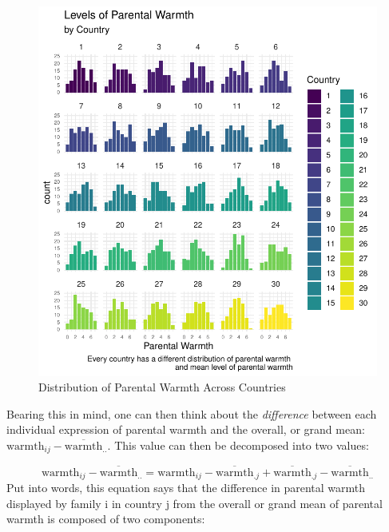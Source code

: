\documentclass[
  letterpaper,
  DIV=11,
  numbers=noendperiod]{scrreprt}
\begin{document}
\begin{figure}

{\centering \includegraphics{./cross-sectional_files/figure-pdf/fig-distributionwarmth-1.pdf}

}

\caption{\label{fig-distributionwarmth}Distribution of Parental Warmth
Across Countries}

\end{figure}

Bearing this in mind, one can then think about the \emph{difference}
between each individual expression of parental warmth and the overall,
or grand mean: \(\text{warmth}_{ij} - \overline{\text{warmth}}_{..}\).
This value can then be decomposed into two values:

\[\text{warmth}_{ij} - \overline{\text{warmth}}_{..} = \text{warmth}_{ij} - \overline{\text{warmth}}_{.j} + \overline{\text{warmth}}_{.j} - \overline{\text{warmth}}_{..}\]
Put into words, this equation says that the difference in parental
warmth displayed by family i in country j from the overall or grand mean
of parental warmth is composed of two components:
\end{document}
